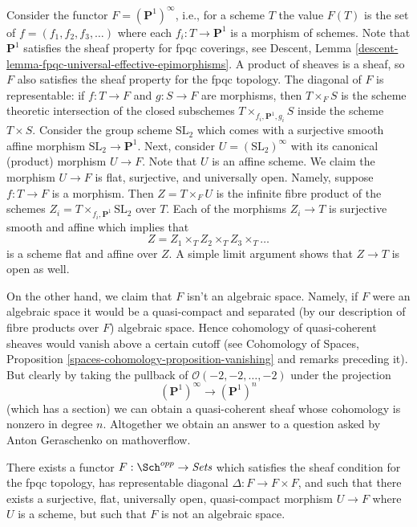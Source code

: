 \noindent
Consider the functor $F = (\mathbf{P}^1)^\infty$, i.e., for a scheme $T$
the value $F(T)$ is the set of $f = (f_1, f_2, f_3, \ldots)$ where each
$f_i : T \to \mathbf{P}^1$ is a morphism of schemes. Note that
$\mathbf{P}^1$ satisfies the sheaf property for fpqc coverings, see
Descent, Lemma \ref{descent-lemma-fpqc-universal-effective-epimorphisms}.
A product of sheaves is a sheaf, so $F$ also satisfies the sheaf property for
the fpqc topology. The diagonal of $F$ is representable: if $f : T \to F$
and $g : S \to F$ are morphisms, then $T \times_F S$ is the scheme theoretic
intersection of the closed subschemes $T \times_{f_i, \mathbf{P}^1, g_i} S$
inside the scheme $T \times S$. Consider the group scheme $\text{SL}_2$ which
comes with a surjective smooth affine morphism $\text{SL}_2 \to \mathbf{P}^1$.
Next, consider $U = (\text{SL}_2)^\infty$ with its canonical (product) morphism
$U \to F$. Note that $U$ is an affine scheme. We claim the morphism
$U \to F$ is flat, surjective, and universally open. Namely, suppose
$f : T \to F$ is a morphism. Then $Z = T \times_F U$ is the infinite
fibre product of the schemes $Z_i = T \times_{f_i, \mathbf{P}^1} \text{SL}_2$
over $T$. Each of the morphisms $Z_i \to T$ is surjective smooth and
affine which implies that
$$
Z = Z_1 \times_T Z_2 \times_T Z_3 \times_T \ldots
$$
is a scheme flat and affine over $Z$. A simple limit argument shows that
$Z \to T$ is open as well.

\medskip\noindent
On the other hand, we claim that $F$ isn't an algebraic space.
Namely, if $F$ were an algebraic space it would be a quasi-compact
and separated (by our description of fibre products over $F$) algebraic
space. Hence cohomology of quasi-coherent sheaves would vanish above a
certain cutoff (see
Cohomology of Spaces, Proposition \ref{spaces-cohomology-proposition-vanishing}
and remarks preceding it). But clearly by taking the pullback
of $\mathcal{O}(-2, -2, \ldots, -2)$ under the projection
$$
(\mathbf{P}^1)^\infty \longrightarrow (\mathbf{P}^1)^n
$$
(which has a section) we can obtain a quasi-coherent sheaf whose cohomology
is nonzero in degree $n$. Altogether we obtain an answer to a question asked
by Anton Geraschenko on mathoverflow.

\begin{lemma}
\label{lemma-not-algebraic}
There exists a functor $F : \Sch^{opp} \to \textit{Sets}$
which satisfies the sheaf condition for the fpqc topology, has representable
diagonal $\Delta : F \to F \times F$, and such that there exists a
surjective, flat, universally open, quasi-compact morphism
$U \to F$ where $U$ is a scheme, but such that $F$ is not an algebraic space.
\end{lemma}

